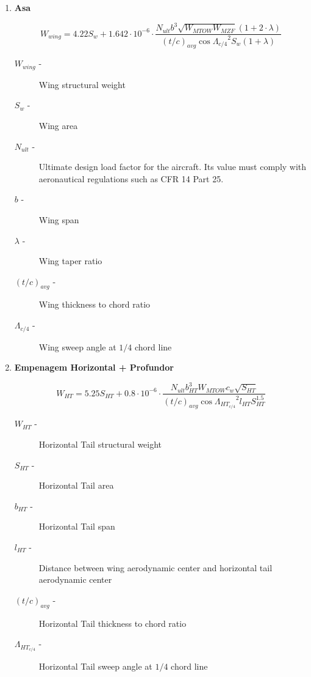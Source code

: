 \begin{enumerate}
\item \textbf{Asa}

\begin{equation}
W_{wing} = 4.22 S_{w} + 1.642 \cdot 10^{-6} \cdot \frac{  N_{ult} b^3 \sqrt{W_{MTOW} W_{MZF}} (1 + 2\cdot \lambda) }{(t/c)_{avg} \cos{\Lambda_{c/4}}^2 S_w (1+\lambda) }
\end{equation}

\begin{description}
\item [$W_{wing}$ -] Wing structural weight
\item [$S_{w}$ -] Wing area
\item [$N_{ult}$ -] Ultimate design load factor for the aircraft. Its value must comply with aeronautical regulations such as CFR 14 Part 25.
\item [$b$ -] Wing span
\item [$\lambda$ -] Wing taper ratio
\item [$(t/c)_{avg}$ -] Wing thickness to chord ratio
\item [$\Lambda_{c/4}$ -] Wing sweep angle at $1/4$ chord line
\end{description}

\vspace{0.5cm}

\item \textbf{Empenagem Horizontal + Profundor}

\begin{equation}
W_{HT} = 5.25 S_{HT} + 0.8 \cdot 10^{-6} \cdot \frac{ N_{ult} b_{HT}^3 W_{MTOW} c_w \sqrt{S_{HT}} } { (t/c)_{avg} \cos{\Lambda_{HT_{c/4}}}^2  l_{HT} S_{HT}^{1.5}}
\end{equation}

\begin{description}
\item [$W_{HT}$ -] Horizontal Tail structural weight
\item [$S_{HT}$ -] Horizontal Tail area
\item [$b_{HT}$ -] Horizontal Tail span
\item [$l_{HT}$ -] Distance between wing aerodynamic center and horizontal tail aerodynamic center
\item [$(t/c)_{avg}$ -] Horizontal Tail thickness to chord ratio
\item [$\Lambda_{HT_{c/4}}$ -] Horizontal Tail sweep angle at $1/4$ chord line
\end{description}


\end{enumerate}
